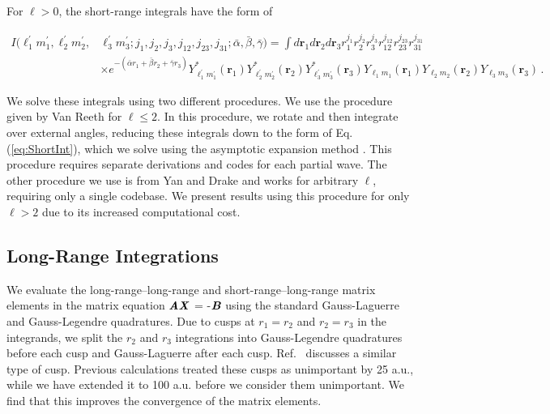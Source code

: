\documentclass[preprint,showpacs,showkeys,preprintnumbers,amsmath,amssymb,longbibliography,pra,aps]{revtex4-1}
\begin{document}
For $\ell > 0$, the short-range integrals have the form of
\begin{widetext}
\begin{align}
\label{eq:ShortIntGen}
\nonumber I(\ell_1^\prime m_1^\prime, \ell_2^\prime m_2^\prime, &\ell_3^\prime m_3^\prime; j_1,j_2,j_3,j_{12},j_{23},j_{31}; \bar{\alpha}, \bar{\beta}, \bar{\gamma}) = \int d \textbf{r}_1 d \textbf{r}_2 d \textbf{r}_3
r_1^{j_1} r_2^{j_2} r_3^{j_3} r_{12}^{j_{12}}
r_{23}^{j_{23}} r_{31}^{j_{31}} \\
& \times e^{-(\bar{\alpha} r_1 + \bar{\beta} r_2 + \bar{\gamma} r_3)}
Y_{\ell_1^\prime m_1^\prime}^* (\textbf{r}_1) Y_{\ell_2^\prime m_2^\prime}^* (\textbf{r}_2) Y_{\ell_3^\prime m_3^\prime}^* (\textbf{r}_3) Y_{\ell_1 m_1} (\textbf{r}_1) Y_{\ell_2 m_2} (\textbf{r}_2) Y_{\ell_3 m_3} (\textbf{r}_3)\, .
\end{align}
\end{widetext}
We solve these integrals using two different procedures.
We use the procedure given by Van Reeth \cite{VanReethThesis}
for $\ell \leq 2$. In this 
procedure, we rotate and then integrate over external angles, reducing these 
integrals down to the form of Eq. (\ref{eq:ShortInt}), which we solve using
the asymptotic expansion method \cite{Drake1995}.
This procedure requires separate derivations and codes
for each partial wave. The other procedure we use
is from Yan and Drake \cite{Yan1997}
and works for arbitrary $\ell$, requiring only a single codebase.
We present results using this procedure for only $\ell > 2$ due
to its increased computational cost.

\subsection{Long-Range Integrations}
\label{sec:LongInt}
We evaluate the long-range--long-range and short-range--long-range matrix 
elements in the matrix equation $\textbf{\emph{AX}}$ = -$\textbf{\emph{B}}$
using the standard Gauss-Laguerre
and Gauss-Legendre quadratures. Due to cusps at $r_1 = r_2$ and
$r_2 = r_3$ in the integrands, we split the $r_2$ and $r_3$ integrations into 
Gauss-Legendre quadratures before each cusp and Gauss-Laguerre after each cusp.
Ref.~\cite{Armour1991} discusses a similar type of cusp.
Previous calculations \cite{VanReeth2003,VanReeth2004} treated these cusps as 
unimportant by 25 a.u., while we have extended it to 100 a.u. before we consider 
them unimportant. We find that this improves the convergence of the matrix 
elements.
\end{document}
